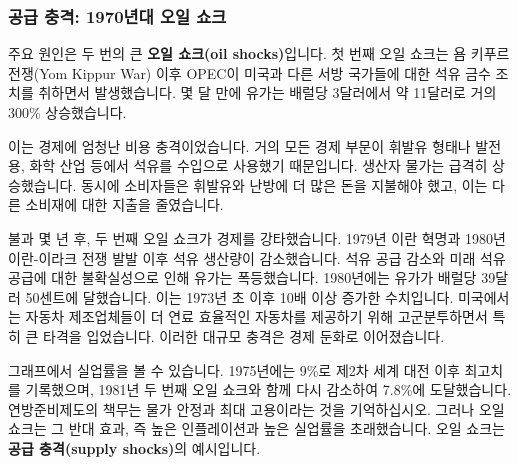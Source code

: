 \documentclass[11pt,a4paper]{article}
\begin{document}
\subsubsection*{공급 충격: 1970년대 오일 쇼크}

주요 원인은 두 번의 큰 \textbf{오일 쇼크(oil shocks)}입니다. 첫 번째 오일 쇼크는 욤 키푸르 전쟁(Yom Kippur War) 이후 OPEC이 미국과 다른 서방 국가들에 대한 석유 금수 조치를 취하면서 발생했습니다. 몇 달 만에 유가는 배럴당 3달러에서 약 11달러로 거의 300\% 상승했습니다.


이는 경제에 엄청난 비용 충격이었습니다. 거의 모든 경제 부문이 휘발유 형태나 발전용, 화학 산업 등에서 석유를 수입으로 사용했기 때문입니다. 생산자 물가는 급격히 상승했습니다. 동시에 소비자들은 휘발유와 난방에 더 많은 돈을 지불해야 했고, 이는 다른 소비재에 대한 지출을 줄였습니다.

불과 몇 년 후, 두 번째 오일 쇼크가 경제를 강타했습니다. 1979년 이란 혁명과 1980년 이란-이라크 전쟁 발발 이후 석유 생산량이 감소했습니다. 석유 공급 감소와 미래 석유 공급에 대한 불확실성으로 인해 유가는 폭등했습니다. 1980년에는 유가가 배럴당 39달러 50센트에 달했습니다. 이는 1973년 초 이후 10배 이상 증가한 수치입니다. 미국에서는 자동차 제조업체들이 더 연료 효율적인 자동차를 제공하기 위해 고군분투하면서 특히 큰 타격을 입었습니다. 이러한 대규모 충격은 경제 둔화로 이어졌습니다.

그래프에서 실업률을 볼 수 있습니다. 1975년에는 9\%로 제2차 세계 대전 이후 최고치를 기록했으며, 1981년 두 번째 오일 쇼크와 함께 다시 감소하여 7.8\%에 도달했습니다. 연방준비제도의 책무는 물가 안정과 최대 고용이라는 것을 기억하십시오. 그러나 오일 쇼크는 그 반대 효과, 즉 높은 인플레이션과 높은 실업률을 초래했습니다. 오일 쇼크는 \textbf{공급 충격(supply shocks)}의 예시입니다.
\end{document}
